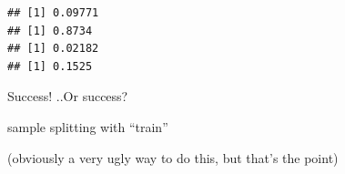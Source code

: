\documentclass[
]{krantz}
\makeatletter
\newenvironment{Shaded}{\begin{snugshade}}{\end{snugshade}}
\newcommand{\AttributeTok}[1]{\textcolor[rgb]{0.61,0.61,0.61}{#1}}
\newcommand{\CommentTok}[1]{\textcolor[rgb]{0.37,0.37,0.37}{\textit{#1}}}
\newcommand{\FunctionTok}[1]{\textcolor[rgb]{0,0,0}{#1}}
\newcommand{\NormalTok}[1]{#1}
\newcommand{\SpecialCharTok}[1]{\textcolor[rgb]{0,0,0}{#1}}
\newenvironment{kframe}{%
\medskip{}
\setlength{\fboxsep}{.8em}
 \def\at@end@of@kframe{}%
 \ifinner\ifhmode%
  \def\at@end@of@kframe{\end{minipage}}%
  \begin{minipage}{\columnwidth}%
 \fi\fi%
 \def\FrameCommand##1{\hskip\@totalleftmargin \hskip-\fboxsep
 \colorbox{shadecolor}{##1}\hskip-\fboxsep
     \hskip-\linewidth \hskip-\@totalleftmargin \hskip\columnwidth}%
 \MakeFramed {\advance\hsize-\width
   \@totalleftmargin\z@ \linewidth\hsize
   \@setminipage}}%
 {\par\unskip\endMakeFramed%
 \at@end@of@kframe}
\renewenvironment{Shaded}{\begin{kframe}}{\end{kframe}}
\makeatother
\begin{document}
\begin{Shaded}
\end{Shaded}

\begin{verbatim}
## [1] 0.09771
## [1] 0.8734
## [1] 0.02182
## [1] 0.1525
\end{verbatim}

Success! ..Or success?

sample splitting with ``train''

(obviously a very ugly way to do this, but that's the point)
\end{document}
